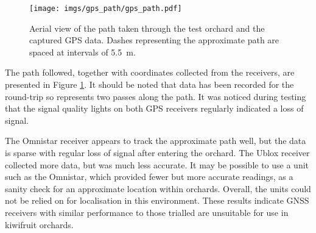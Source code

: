 \documentclass[preprint,authoryear,12pt]{elsarticle}
\begin{document}
        \begin{figure}[htb]
            \centering
            \texttt{[image: imgs/gps\_path/gps\_path.pdf]}
            \caption{
                Aerial view of the path taken through the test orchard and the captured GPS data.
                Dashes representing the approximate path are spaced at intervals of \SI{5.5}{\meter}.
            }
            \label{fig:gpsResults}
        \end{figure}

        The path followed, together with coordinates collected from the receivers, are presented in Figure \ref{fig:gpsResults}.
        It should be noted that data has been recorded for the round-trip so represents two passes along the path.
        It was noticed during testing that the signal quality lights on both GPS receivers regularly indicated a loss of signal.

        The Omnistar receiver appears to track the approximate path well, but the data is sparse with regular loss of signal after entering the orchard.
    	The Ublox receiver collected more data, but was much less accurate.
        It may be possible to use a unit such as the Omnistar, which provided fewer but more accurate readings, as a sanity check for an approximate location within orchards.
        Overall, the units could not be relied on for localisation in this environment.
        These results indicate GNSS receivers with similar performance to those trialled are unsuitable for use in kiwifruit orchards.





\end{document}
